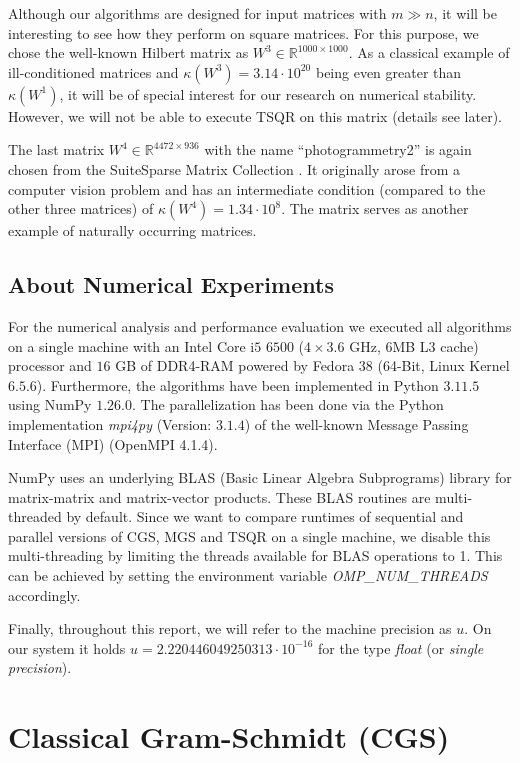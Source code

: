 \documentclass{article}
\begin{document}
Although our algorithms are designed for input matrices with $m \gg n$, it will
be interesting to see how they perform on square matrices. For this purpose, we
chose the well-known Hilbert matrix as $W^3 \in \mathbb{R}^{1000 \times 1000}$.
As a classical example of ill-conditioned matrices and $\kappa(W^3) = 3.14
\cdot10^{20}$ being even greater than $\kappa(W^1)$, it will be of special
interest for our research on numerical stability. However, we will not be able
to execute TSQR on this matrix (details see later).

The last matrix $W^4 \in \mathbb{R}^{4472 \times 936}$ with the name
\enquote{photogrammetry2} is again chosen from the SuiteSparse Matrix Collection
\cite{DavisHu:2011}. It originally arose from a computer vision problem and has
an intermediate condition (compared to the other three matrices) of $\kappa(W^4)
= 1.34 \cdot10^{8}$. The matrix serves as another example of naturally occurring
matrices.

\subsection{About Numerical Experiments}

For the numerical analysis and performance evaluation we executed all algorithms
on a single machine with an Intel Core i$5$ $6500$ ($4 \times 3.6$ GHz, $6$MB L3
cache) processor and $16$ GB of DDR4-RAM powered by Fedora 38 (64-Bit, Linux
Kernel $6.5.6$). Furthermore, the algorithms have been implemented in Python
$3.11.5$ using NumPy $1.26.0$. The parallelization has been done via the Python
implementation \textit{mpi4py} (Version: $3.1.4$) of the well-known Message
Passing Interface (MPI) (OpenMPI 4.1.4).

NumPy uses an underlying BLAS (Basic Linear Algebra Subprograms) library for
matrix-matrix and matrix-vector products. These BLAS routines are multi-threaded
by default. Since we want to compare runtimes of sequential and parallel
versions of CGS, MGS and TSQR on a single machine, we disable this
multi-threading by limiting the threads available for BLAS operations to 1. This
can be achieved by setting the environment variable \textit{OMP\_NUM\_THREADS}
accordingly.

Finally, throughout this report, we will refer to the machine precision as $u$.
On our system it holds $u = 2.220446049250313 \cdot 10^{-16}$ for the type
\textit{float} (or \textit{single precision}).

\section{Classical Gram-Schmidt (CGS)}
\end{document}
